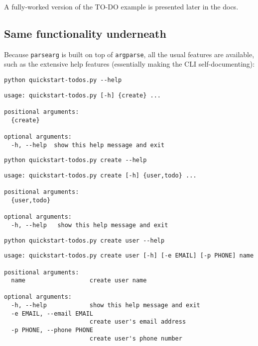 \documentclass[10pt]{amsart}
\numberwithin{equation}{section}
\begin{document}
A fully-worked version of the TO-DO example is presented later in the docs. 

\subsection{Same functionality underneath}
\label{sec:org6000aeb}
Because \texttt{parsearg} is built on top of \texttt{argparse}, all the usual features
are available, such as the extensive help features (essentially
making the CLI self-documenting):
\begin{verbatim}
python quickstart-todos.py --help
\end{verbatim}

\begin{verbatim}
usage: quickstart-todos.py [-h] {create} ...

positional arguments:
  {create}

optional arguments:
  -h, --help  show this help message and exit
\end{verbatim}



\begin{verbatim}
python quickstart-todos.py create --help
\end{verbatim}

\begin{verbatim}
usage: quickstart-todos.py create [-h] {user,todo} ...

positional arguments:
  {user,todo}

optional arguments:
  -h, --help   show this help message and exit
\end{verbatim}


\begin{verbatim}
python quickstart-todos.py create user --help
\end{verbatim}

\begin{verbatim}
usage: quickstart-todos.py create user [-h] [-e EMAIL] [-p PHONE] name

positional arguments:
  name                  create user name

optional arguments:
  -h, --help            show this help message and exit
  -e EMAIL, --email EMAIL
                        create user's email address
  -p PHONE, --phone PHONE
                        create user's phone number
\end{verbatim}
\end{document}
